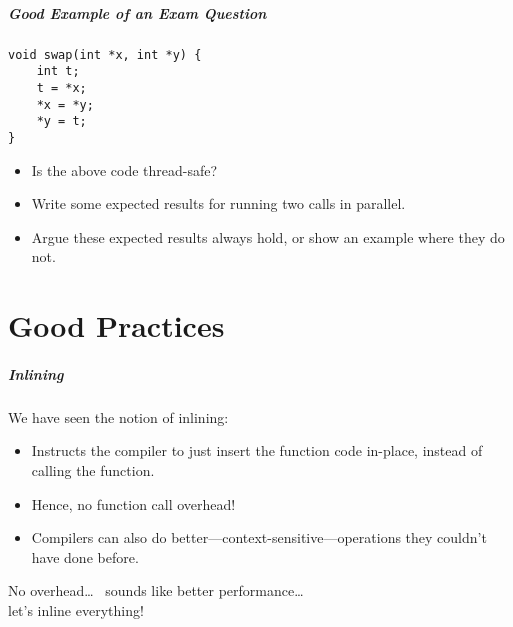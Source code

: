 \begin{frame}[fragile]
  \frametitle{Good Example of an Exam Question}

  

  \begin{lstlisting}
void swap(int *x, int *y) {
    int t;
    t = *x;
    *x = *y;
    *y = t;
}  
  \end{lstlisting}
  \vfill
  \begin{itemize}
    \item Is the above code thread-safe?
    \vfill
    \item Write some expected results for running two calls in parallel.
    \vfill
    \item Argue these expected results always hold, or show an example where
      they do not.
  \end{itemize}
  
\end{frame}

\part{Good Practices}
\frame{\partpage}

\begin{frame}
  \frametitle{Inlining}

  

  We have seen the notion of inlining:
  \begin{itemize}
    \item Instructs the compiler to just insert the function code in-place,
      instead of calling the function.
    \item Hence, no function call overhead!
    \item Compilers can also do better---context-sensitive---operations they couldn't
      have done before.
  \end{itemize}
  \vfill
  No overhead\ldots~ sounds like better performance\ldots~ \\let's inline everything!
  
\end{frame}

